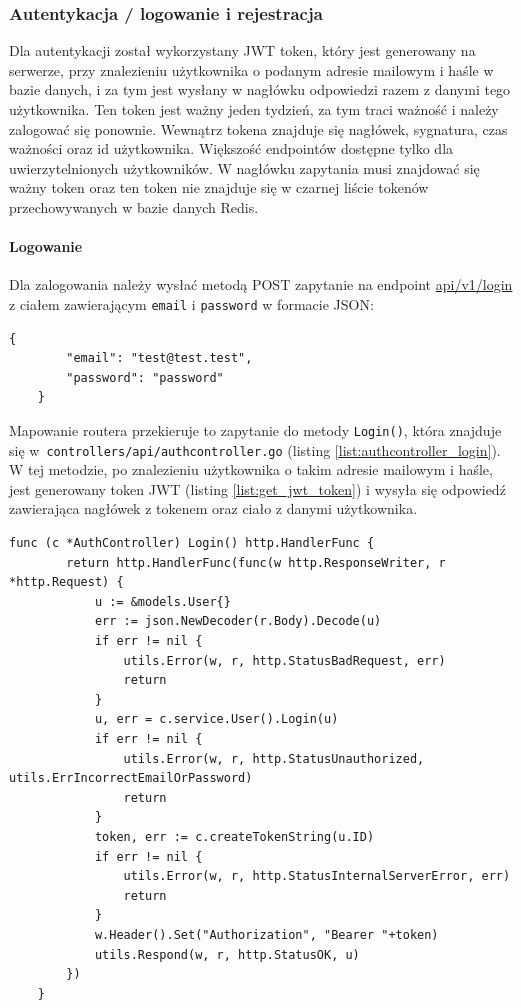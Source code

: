 \subsubsection{Autentykacja / logowanie i rejestracja}
\label{sec:autentykacja}
Dla autentykacji został wykorzystany JWT token, który jest generowany na serwerze, przy znalezieniu użytkownika o podanym adresie mailowym i haśle w bazie danych, i za tym jest wysłany w nagłówku odpowiedzi razem z danymi tego użytkownika.
Ten token jest ważny jeden tydzień, za tym traci ważność i należy zalogować się ponownie. Wewnątrz tokena znajduje się nagłówek, sygnatura, czas ważności oraz id użytkownika.
Większość endpointów dostępne tylko dla uwierzytelnionych użytkowników. W nagłówku zapytania musi znajdować się ważny token oraz ten token nie znajduje się w czarnej liście tokenów przechowywanych w bazie danych Redis.

\paragraph{Logowanie\newline}
Dla zalogowania należy wysłać metodą POST zapytanie na endpoint \url{api/v1/login} z ciałem zawierającym \texttt{email} i \texttt{password} w formacie JSON:
\begin{lstlisting}[basicstyle=\tiny\ttfamily]
    {
        "email": "test@test.test",
        "password": "password"
    }
\end{lstlisting}

Mapowanie routera przekieruje to zapytanie do metody \texttt{Login()}, która znajduje się w~\texttt{controllers/api/authcontroller.go} (listing \ref{list:authcontroller_login}).
W tej metodzie, po znalezieniu użytkownika o takim adresie mailowym i haśle, jest generowany token JWT (listing \ref{list:get_jwt_token}) i wysyła się odpowiedź zawierająca nagłówek z tokenem oraz ciało z danymi użytkownika.
\begin{lstlisting}[label=list:authcontroller_login,caption=Kontroller logowania użytkownika,basicstyle=\tiny\ttfamily]
    func (c *AuthController) Login() http.HandlerFunc {
        return http.HandlerFunc(func(w http.ResponseWriter, r *http.Request) {
            u := &models.User{}
            err := json.NewDecoder(r.Body).Decode(u)
            if err != nil {
                utils.Error(w, r, http.StatusBadRequest, err)
                return
            }
            u, err = c.service.User().Login(u)
            if err != nil {
                utils.Error(w, r, http.StatusUnauthorized, utils.ErrIncorrectEmailOrPassword)
                return
            }
            token, err := c.createTokenString(u.ID)
            if err != nil {
                utils.Error(w, r, http.StatusInternalServerError, err)
                return
            }
            w.Header().Set("Authorization", "Bearer "+token)
            utils.Respond(w, r, http.StatusOK, u)
        })
    }
\end{lstlisting}

